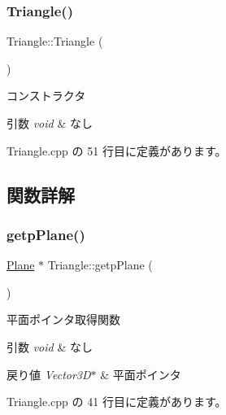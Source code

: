 \subsubsection{\texorpdfstring{Triangle()}{Triangle()}}
{\footnotesize\ttfamily Triangle\+::\+Triangle (\begin{DoxyParamCaption}{ }\end{DoxyParamCaption})}



コンストラクタ 


\begin{DoxyParams}{引数}
{\em void} & なし \\
\hline
\end{DoxyParams}


 Triangle.\+cpp の 51 行目に定義があります。



\subsection{関数詳解}
\mbox{\label{class_triangle_a4d0713aa2052d4b6cbde72202bcaca20}} 
\subsubsection{\texorpdfstring{getp\+Plane()}{getpPlane()}}
{\footnotesize\ttfamily \mbox{\hyperlink{class_plane}{Plane}} $\ast$ Triangle\+::getp\+Plane (\begin{DoxyParamCaption}{ }\end{DoxyParamCaption})}



平面ポインタ取得関数 


\begin{DoxyParams}{引数}
{\em void} & なし \\
\hline
\end{DoxyParams}

\begin{DoxyRetVals}{戻り値}
{\em Vector3\+D$\ast$} & 平面ポインタ \\
\hline
\end{DoxyRetVals}


 Triangle.\+cpp の 41 行目に定義があります。

\mbox{\label{class_triangle_a7fa9f7bdcffefa718b80cc9171575341}} 
